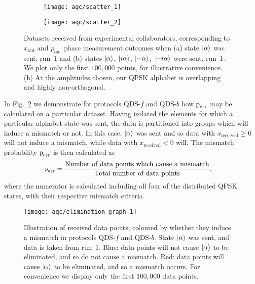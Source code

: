 \begin{figure}[htp]
\captionsetup{width=\linewidth}
\centering
	\begin{subfigure}{0.49\linewidth}
	\centering
	\texttt{[image: aqc/scatter\_1]}
	\caption{}
	\end{subfigure}
	\begin{subfigure}{0.49\linewidth}
	\centering
	\texttt{[image: aqc/scatter\_2]}
	\end{subfigure}
\caption{\label{fig:aqc_scatter} Datasets received from experimental collaborators, corresponding to $x_{\text{out}}$ and $p_{\text{out}}$ phase measurement outcomes when (a) state $\ket{\alpha}$ was sent, run~$1$ and (b) states $\ket{\alpha}$, $\ket{i \alpha}$, $\ket{- \alpha}$, $\ket{- i \alpha}$ were sent, run~$1$. We plot only the first $100,000$ points, for illustrative convenience. (b) At the amplitudes chosen, our QPSK alphabet is overlapping and highly non-orthogonal.}
\end{figure}

In Fig.~\ref{fig:aqc_elimsig} we demonstrate for protocols QDS-$f$ and QDS-$b$ how $\text{p}_{\text{err}}$ may be calculated on a particular dataset. Having isolated the elements for which a particular alphabet state was sent, the data is partitioned into groups which will induce a mismatch or not. In this case, $\ket{\alpha}$ was sent and so data with $x_{\text{received}} \ge 0$ will not induce a mismatch, while data with $x_{\text{received}}<0$ will. The mismatch probability $\text{p}_{\text{err}}$ is then calculated as
\begin{equation}\label{eqn:aqc_data_perr}
\text{p}_{\text{err}} = \frac{\text{Number of data points which cause a mismatch}}{\text{Total number of data points}},
\end{equation}
where the numerator is calculated including all four of the distributed QPSK states, with their respective mismatch criteria.

\begin{figure}[htp]
\captionsetup{width=\linewidth}
\centering
\texttt{[image: aqc/elimination\_graph\_1]}
\caption{\label{fig:aqc_elimsig} Illustration of received data points, coloured by whether they induce a mismatch in protocols QDS-$f$ and QDS-$b$. State $\ket{\alpha}$ was sent, and data is taken from run~$1$. Blue: data points will not cause $\ket{\alpha}$ to be eliminated, and so do not cause a mismatch. Red: data points will cause $\ket{\alpha}$ to be eliminated, and so a mismatch occurs. For convenience we display only the first $100,000$ data points.}
\end{figure}

